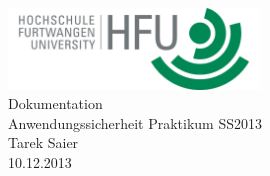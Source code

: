 \documentclass[pdftex,fontsize=11pt,a4paper]{scrbook}
\begin{document}
\begin{titlepage}
\thispagestyle{empty}
\begin{center}
\includegraphics[width=0.5\textwidth]{hfu.png}~\\[1.5cm]
\Huge Dokumentation\\[0.4cm]
\Huge Anwendungssicherheit Praktikum SS2013\\[1cm]
\LARGE Tarek Saier\\[0.2cm]
\normalsize 10.12.2013
\end{center}
\end{titlepage}
\end{document}
